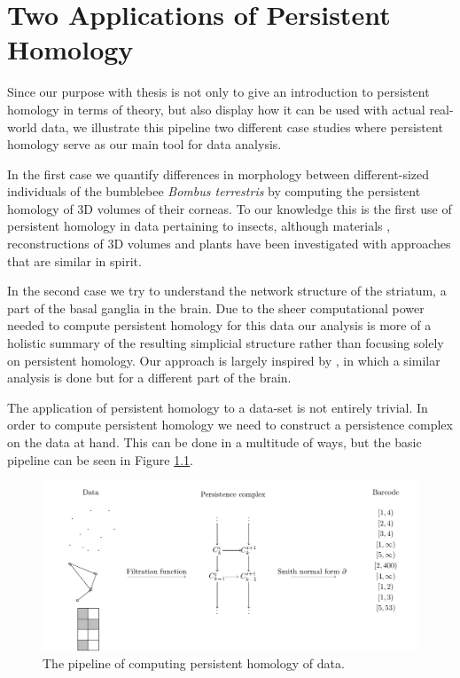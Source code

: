 \chapter{Two Applications of Persistent Homology}

Since our purpose with thesis is not only to give an introduction to persistent homology in terms of theory, but also display how it can be used with actual real-world data, we illustrate this pipeline two different case studies where persistent homology serve as our main tool for data analysis.

In the first case we quantify differences in morphology between different-sized individuals of the bumblebee \textit{Bombus terrestris} by computing the persistent homology of 3D volumes of their corneas. To our knowledge this is the first use of persistent homology in data pertaining to insects, although materials \cite{moon2019, delgadofriedrichs2014}, reconstructions of 3D volumes \cite{gutierrez2012, gutierrez2014} and plants \cite{plants} have been investigated with approaches that are similar in spirit.

In the second case we try to understand the network structure of the striatum, a part of the basal ganglia in the brain. Due to the sheer computational power needed to compute persistent homology for this data our analysis is more of a holistic summary of the resulting simplicial structure rather than focusing solely on persistent homology. Our approach is largely inspired by \cite{reimann}, in which a similar analysis is done but for a different part of the brain.

The application of persistent homology to a data-set is not entirely trivial. In order to compute persistent homology we need to construct a persistence complex on the data at hand. This can be done in a multitude of ways, but the basic pipeline can be seen in Figure \ref{pipeline}.

\begin{figure}[h]
  \centering
  \includegraphics[scale=0.8]{pipeline.pdf}
  \caption{\label{pipeline} The pipeline of computing persistent homology of data.}
\end{figure}

